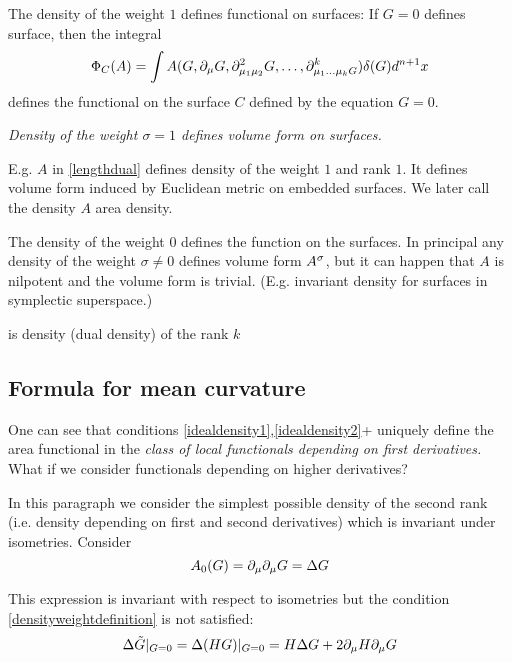 \documentclass[12pt]{article}
\theoremstyle{theorem}
\begin{document}
The density of the weight $1$ defines functional on surfaces:
If $G=0$ defines surface, then the integral
\begin{equation}\label{surfacefunctional}
    \Phi_C(A)=\int A(
    G,\partial_\mu G, \partial^2_{\mu_{1}\mu_2}G,\dots,\partial^k_{\mu_{1}\dots{\mu_k}G})\delta(G)d^{n+1}x
\end{equation}
defines the functional on the surface $C$ defined  by the equation $G=0$.

{\it Density of the weight $\sigma=1$ defines volume form on surfaces.}

E.g.  $A$ in \eqref{lengthdual} defines density of the weight $1$ and rank $1$.
It defines volume form induced by Euclidean metric on embedded surfaces.
We later call the density $A$ area density.

The density of the weight $0$ defines the function on the surfaces.
In principal any density of the weight $\sigma\not=0$ defines volume form
$A^{\sigma}$, but it can happen that
$A$ is nilpotent and the volume form is trivial. (E.g. invariant density
for surfaces in symplectic superspace.)

is density (dual density) of the rank $k$



\subsection {Formula for mean curvature}

One can see that conditions \eqref{idealdensity1},\eqref{idealdensity2}+ uniquely define
the area functional in the {\it class of local functionals depending on first derivatives.}
What if we consider functionals depending on higher derivatives?

\medskip



In this paragraph we consider the simplest possible density of the second rank
(i.e. density depending on first and second derivatives)
which is invariant under isometries.
 Consider
        \begin{equation}\label{zerothorder}
    A_0(G)=\partial_\mu \partial_\mu G=\Delta G
\end{equation}

 This expression is invariant with respect to isometries
 but the condition
\eqref{densityweightdefinition} is not satisfied:
 \begin{equation}\label{checkingthecondition1}
\Delta \tilde G\vert_{G=0}=\Delta(HG)\vert_{G=0}=H\Delta G+2\partial_\mu H\partial_\mu G
\end{equation}
\end{document}
